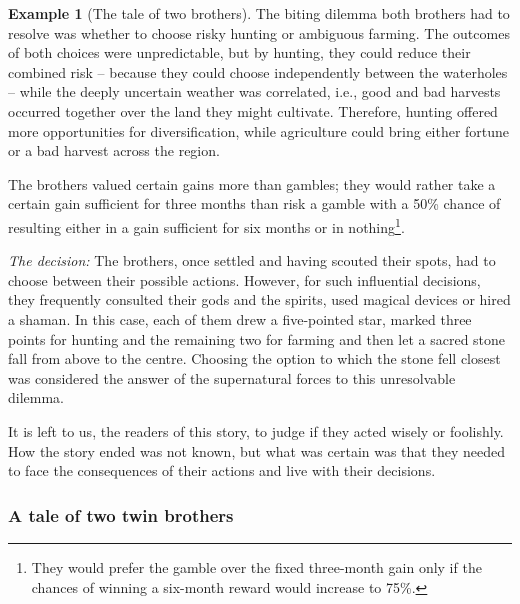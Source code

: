\documentclass{article}
\theoremstyle{definition}
\newtheorem*{example}{Example}
\begin{document}
\begin{example}[The tale of two brothers]
The biting dilemma both brothers had to resolve was whether to choose risky hunting or ambiguous farming. The outcomes of both choices were unpredictable, but by hunting, they could reduce their combined risk -- because they could choose independently between the waterholes -- while the deeply uncertain weather was correlated, i.e., good and bad harvests occurred together over the land they might cultivate.
Therefore, hunting offered more opportunities for diversification, while agriculture could bring either fortune or a bad harvest across the region.

The brothers valued certain gains more than gambles; they would rather take a certain gain sufficient for three months than risk a gamble with a 50\% chance of resulting either in a gain sufficient for six months or in nothing\footnote{They would prefer the gamble over the fixed three-month gain only if the chances of winning a six-month reward would increase to 75\%.}.

{\it The decision:}
The brothers, once settled and having scouted their spots, had to choose between their possible actions. However, for such influential decisions, they frequently consulted their gods and the spirits, used magical devices or hired a shaman. In this case, each of them drew a five-pointed star, marked three points for hunting and the remaining two for farming and then let a sacred stone fall from above to the centre. Choosing the option to which the stone fell closest was considered the answer of the supernatural forces to this unresolvable dilemma.

It is left to us, the readers of this story, to judge if they acted wisely or foolishly.
How the story ended was not known, but what was certain was that they needed to face the consequences of their actions and live with their decisions.

\end{example}
\subsubsection{A tale of two twin brothers}
\end{document}
